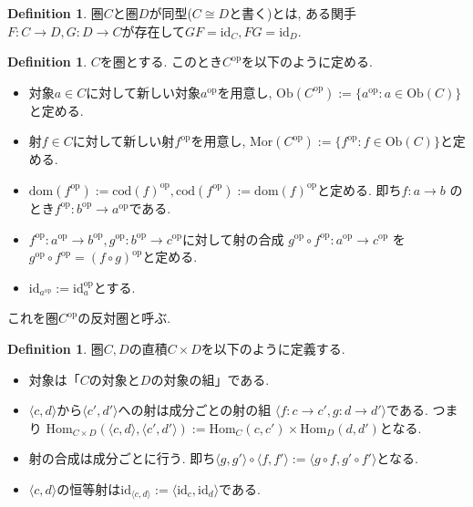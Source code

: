 \documentclass[a4paper,10pt]{article}
\theoremstyle{definition}
\newtheorem{definition}[thm]{\bfseries Definition}
\begin{document}
\begin{definition}
    圏$C$と圏$D$が同型($C \cong D$と書く)とは, ある関手$F: C \rightarrow D,
    G: D \rightarrow C$が存在して$GF= \mathrm{\mathrm{id}}_C, FG=\mathrm{id}_D$.
\end{definition}
\begin{definition}
    $C$を圏とする. このとき$C^{\mathrm{op}}$を以下のように定める.
    \begin{itemize}
        \item 対象$a \in C$に対して新しい対象$a^{\mathrm{op}}$を用意し, $\mathrm{Ob}(C^{\mathrm{op}})
        := \{a^{\mathrm{op}}:a \in \mathrm{Ob}(C)\}$と定める. 
        \item 射$f \in C$に対して新しい射$f^{\mathrm{op}}$を用意し, $\mathrm{Mor}(C^{\mathrm{op}})
        := \{f^{\mathrm{op}}:f \in \mathrm{Ob}(C)\}$と定める. 
        \item $\mathrm{dom}(f^{\mathrm{op}}):=\mathrm{cod}(f)^{\mathrm{op}}, 
        \mathrm{cod}(f^{\mathrm{op}}):=\mathrm{dom}(f)^{\mathrm{op}}$と定める. 即ち$f:a \rightarrow b$
        のとき$f^{\mathrm{op}}: b^{\mathrm{op}} \rightarrow a^{\mathrm{op}}$である.
        \item $f^{\mathrm{op}}:a^{\mathrm{op}} \rightarrow b^{\mathrm{op}}, g^{\mathrm{op}}
        : b^{\mathrm{op}} \rightarrow c^{\mathrm{op}}$に対して射の合成
        $g^{\mathrm{op}}\circ f^{\mathrm{op}}: a^{\mathrm{op}} \rightarrow c^{\mathrm{op}}$
        を $g^{\mathrm{op}}\circ f^{\mathrm{op}}=(f \circ g)^{\mathrm{op}}$と定める.
        \item $\mathrm{id}_{a^{\mathrm{op}}}:= \mathrm{id}_a^{\mathrm{op}}$とする.
    \end{itemize}
    これを圏$C^{\mathrm{op}}$の反対圏と呼ぶ.
\end{definition}
\begin{definition}
    圏$C, D$の直積$C \times D$を以下のように定義する.
    \begin{itemize}
        \item 対象は「$C$の対象と$D$の対象の組」である.
        \item $\langle c,d \rangle$から$\langle c',d' \rangle$への射は成分ごとの射の組
        $\langle f:c \rightarrow c', g: d \rightarrow d' \rangle$である. つまり
        $\textrm{Hom}_{C \times D}(\langle c,d \rangle, \langle c',d' \rangle):=
        \textrm{Hom}_C(c,c') \times \textrm{Hom}_D(d,d')$となる.
        \item 射の合成は成分ごとに行う. 即ち$\langle g, g' \rangle \circ \langle f,f' \rangle
        :=\langle g \circ f, g' \circ f'\rangle$となる.
        \item $\langle c,d \rangle$の恒等射は$\textrm{id}_{\langle c,d \rangle}:=
        \langle \textrm{id}_{c}, \textrm{id}_d \rangle$である.
    \end{itemize}
\end{definition}
\end{document}
